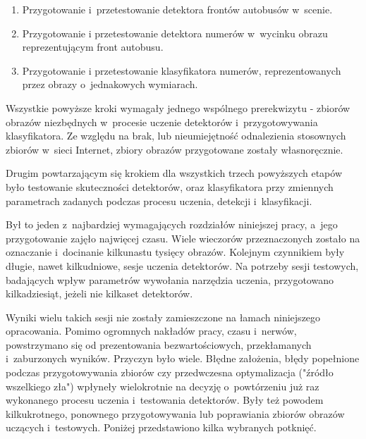 \begin{enumerate}
	\item Przygotowanie i~przetestowanie detektora frontów autobusów w~scenie.
	\item Przygotowanie i przetestowanie detektora numerów w~wycinku obrazu
	reprezentującym front autobusu.
	\item Przygotowanie i przetestowanie klasyfikatora numerów, reprezentowanych
	przez obrazy o~jednakowych wymiarach.
\end{enumerate}

Wszystkie powyższe kroki wymagały jednego wspólnego prerekwizytu - zbiorów obrazów
niezbędnych w~procesie uczenie detektorów i~przygotowywania klasyfikatora.
Ze względu na brak, lub nieumiejętność odnalezienia stosownych zbiorów
w~sieci Internet, zbiory obrazów przygotowane zostały własnoręcznie.

Drugim powtarzającym się krokiem dla wszystkich trzech powyższych etapów było
testowanie skuteczności detektorów, oraz klasyfikatora przy zmiennych
parametrach zadanych podczas procesu uczenia, detekcji i~klasyfikacji.

Był to jeden z~najbardziej wymagających rozdziałów niniejszej pracy, a~jego
przygotowanie zajęło najwięcej czasu. Wiele wieczorów przeznaczonych zostało 
na oznaczanie i~docinanie kilkunastu tysięcy obrazów. Kolejnym czynnikiem były długie,
nawet kilkudniowe, sesje uczenia detektorów. Na potrzeby sesji testowych,
badających wpływ parametrów wywołania narzędzia uczenia, przygotowano
kilkadziesiąt, jeżeli nie kilkaset detektorów.

Wyniki wielu takich sesji nie zostały zamieszczone na łamach niniejszego opracowania.
Pomimo ogromnych nakładów pracy, czasu i~nerwów, powstrzymano się
od prezentowania bezwartościowych, przekłamanych i~zaburzonych wyników.
Przyczyn było wiele.
Błędne założenia, błędy popełnione podczas przygotowywania zbiorów czy 
przedwczesna optymalizacja ("źródło wszelkiego zła") wpłyneły wielokrotnie
na decyzję o~powtórzeniu już raz wykonanego procesu uczenia i~testowania
detektorów. Były też powodem kilkukrotnego, ponownego przygotowywania lub poprawiania
zbiorów obrazów uczących i~testowych. Poniżej przedstawiono kilka wybranych 
potknięć.

